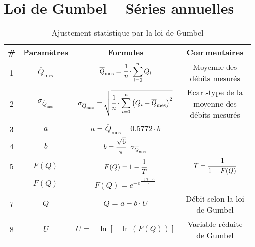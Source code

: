 \section{Loi de Gumbel -- Séries annuelles}
\begin{table}[H]
    \centering
    \begin{tabular}{c|c|c|c}
        \# & \textbf{Paramètres}                & \textbf{Formules}                                                                                                                         & \textbf{Commentaires}      \\
        \hline
        1  & $\overline{Q}_\text{mes}$          & $\overline{Q}_\text{mes} = \cfrac{1}{n} \cdot \displaystyle{\sum_{i=0}^{n} Q_i}$                                                          & Moyenne des débits mesurés \\
        \hline
        2  & $\sigma_{\overline{Q}_\text{mes}}$ & $\sigma_{\overline{Q}_\text{mes}} = \sqrt{\cfrac{1}{n} \cdot \displaystyle{\sum_{i=0}^{n} \left(Q_i - \overline{Q}_\text{mes}\right)^2}}$ & Ecart-type de la moyenne des débits mesurés \\
        \hline
        3  & $a$                                & $a = \overline{Q}_\text{mes} - 0.5772 \cdot b$                                                                                            & \\
        \hline
        4  & $b$                                & $b = \cfrac{\sqrt{6}}{\pi} \cdot \sigma_{\overline{Q}_\text{mes}}$                                                                        & \\
        \hline
        5  & $F(Q)$                             & $F(Q) = 1-\cfrac{1}{T}$                                                                                                                   & $T = \cfrac{1}{1-F(Q)}$     \\
        \hdashline                   
        6  & $F(Q)$                             & $F(Q) = e^{-e^{\frac{- \left(Q-a\right)}{b}}}$                                                                                            & \\
        \hline
        7  & $Q$                                & $Q = a + b \cdot U$                                                                                                                       & Débit selon la loi de Gumbel \\
        \hline
        8  & $U$                                & $U = -\ln \left[ -\ln \left(F(Q)\right)\right]$                                                                                          & Variable réduite de Gumbel   \\
    \end{tabular}
    \caption{Ajustement statistique par la loi de Gumbel}
    \label{tab:loiGumbel}
\end{table}

